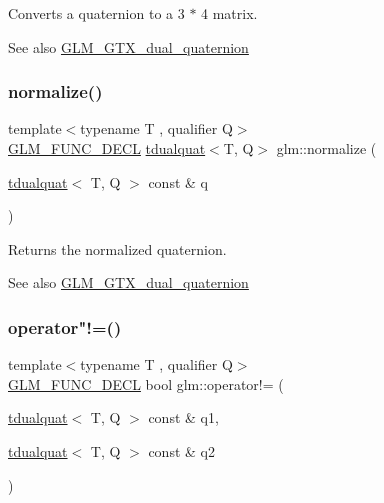 Converts a quaternion to a 3 $\ast$ 4 matrix.

\begin{DoxySeeAlso}{See also}
\hyperlink{group__gtx__dual__quaternion}{G\+L\+M\+\_\+\+G\+T\+X\+\_\+dual\+\_\+quaternion} 
\end{DoxySeeAlso}
\mbox{\label{group__gtx__dual__quaternion_ga299b8641509606b1958ffa104a162cfe}} 
\subsubsection{\texorpdfstring{normalize()}{normalize()}}
{\footnotesize\ttfamily template$<$typename T , qualifier Q$>$ \\
\hyperlink{setup_8hpp_ab2d052de21a70539923e9bcbf6e83a51}{G\+L\+M\+\_\+\+F\+U\+N\+C\+\_\+\+D\+E\+CL} \hyperlink{structglm_1_1tdualquat}{tdualquat}$<$T, Q$>$ glm\+::normalize (\begin{DoxyParamCaption}\item[{\hyperlink{structglm_1_1tdualquat}{tdualquat}$<$ T, Q $>$ const \&}]{q }\end{DoxyParamCaption})}

Returns the normalized quaternion.

\begin{DoxySeeAlso}{See also}
\hyperlink{group__gtx__dual__quaternion}{G\+L\+M\+\_\+\+G\+T\+X\+\_\+dual\+\_\+quaternion} 
\end{DoxySeeAlso}
\mbox{\label{group__gtx__dual__quaternion_ga41964adca31c6e6b52f1367104d15646}} 
\subsubsection{\texorpdfstring{operator"!=()}{operator!=()}}
{\footnotesize\ttfamily template$<$typename T , qualifier Q$>$ \\
\hyperlink{setup_8hpp_ab2d052de21a70539923e9bcbf6e83a51}{G\+L\+M\+\_\+\+F\+U\+N\+C\+\_\+\+D\+E\+CL} bool glm\+::operator!= (\begin{DoxyParamCaption}\item[{\hyperlink{structglm_1_1tdualquat}{tdualquat}$<$ T, Q $>$ const \&}]{q1,  }\item[{\hyperlink{structglm_1_1tdualquat}{tdualquat}$<$ T, Q $>$ const \&}]{q2 }\end{DoxyParamCaption})}

